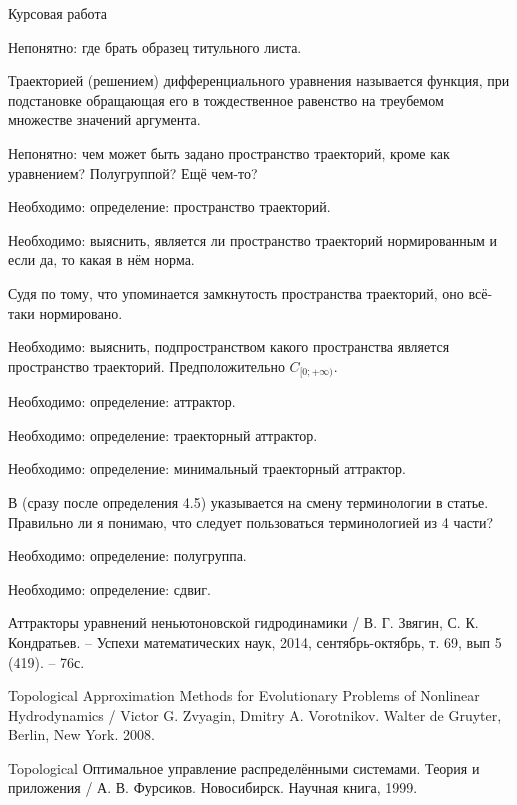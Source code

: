 
\LARGE



Курсовая работа


Непонятно: где брать образец титульного листа.


\opred
Траекторией (решением) дифференциального уравнения называется функция, при подстановке обращающая его в тождественное равенство на треубемом множестве значений аргумента.


Непонятно: чем может быть задано пространство траекторий, кроме как уравнением?
Полугруппой?
Ещё чем-то?


Необходимо: определение: пространство траекторий.


Необходимо: выяснить, является ли пространство траекторий нормированным и если да, то какая в нём норма.


Судя по тому, что упоминается замкнутость пространства траекторий, оно всё-таки нормировано.


Необходимо: выяснить, подпространством какого пространства является пространство траекторий.
Предположительно $C_{[0;+\infty)}$.


Необходимо: определение: аттрактор.


Необходимо: определение: траекторный аттрактор.


Необходимо: определение: минимальный траекторный аттрактор.

В \cite{Kondratyev} (сразу после определения 4.5) указывается на смену терминологии в статье.
Правильно ли я понимаю, что следует пользоваться терминологией из 4 части?


Необходимо: определение: полугруппа.


Необходимо: определение: сдвиг.




\begin{thebibliography}{99}

 Аттракторы уравнений неньютоновской гидродинамики / В. Г. Звягин, С. К. Кондратьев. – Успехи математических наук, 2014, сентябрь-октябрь, т. 69, вып 5 (419). – 76с.

 Topological Approximation Methods for Evolutionary Problems of Nonlinear Hydrodynamics / Victor G. Zvyagin, Dmitry A. Vorotnikov. Walter de Gruyter, Berlin, New York. 2008.

 Topological Оптимальное управление распределёнными системами. Теория и приложения / А. В. Фурсиков. Новосибирск. Научная книга, 1999.

\end{thebibliography}



